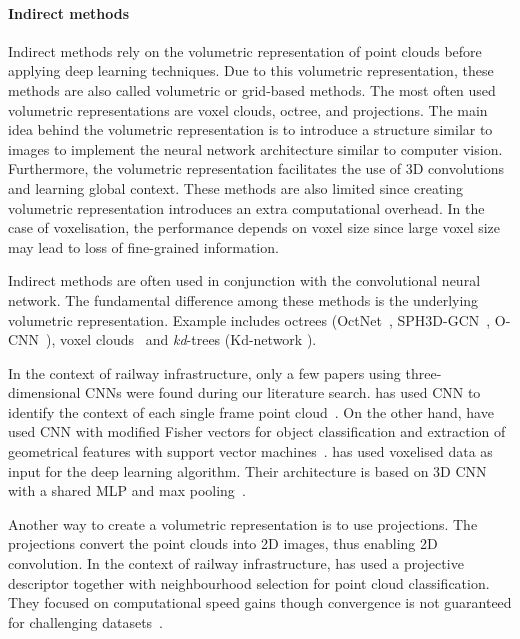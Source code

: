 \paragraph{Indirect methods}
Indirect methods rely on the volumetric representation of point clouds before applying deep learning techniques. Due to this volumetric representation, these methods are also called volumetric or grid-based methods. The most often used volumetric representations are voxel clouds, octree, and projections. The main idea behind the volumetric representation is to introduce a structure similar to images to implement the neural network architecture similar to computer vision. Furthermore, the volumetric representation facilitates the use of 3D convolutions and learning global context. These methods are also limited since creating volumetric representation introduces an extra computational overhead. In the case of voxelisation, the performance depends on voxel size since large voxel size may lead to loss of fine-grained information. 
\par Indirect methods are often used in conjunction with the convolutional neural network. The fundamental difference among these methods is the underlying volumetric representation. Example includes octrees (OctNet~\cite{riegler2017octnet}, SPH3D-GCN~\cite{lei2020spherical}, O-CNN~\cite{wang2017cnn}), voxel clouds~\cite{xu2021voxel} and \textit{kd}-trees (Kd-network \cite{klokov2017escape}).
\par In the context of railway infrastructure, only a few papers using th\-ree-di\-men\-sio\-nal CNNs were found during our literature search. 
\citeauthor{lin2020lidar} has used CNN to identify the context of each single frame point cloud~\cite{lin2020lidar}. On the other hand, \citeauthor{corongiu2020classification} have used CNN with modified Fisher vectors for object classification and extraction of geometrical features with support vector machines~\cite{corongiu2020classification}. 
\citeauthor{yu2022real-time} has used voxelised data as input for the deep learning algorithm. Their architecture is based on 3D CNN with a shared MLP and max pooling~\cite{yu2022real-time}. 

Another way to create a volumetric representation is to use projections. The projections convert the point clouds into 2D images, thus enabling 2D convolution. In the context of railway infrastructure, \citeauthor{manier2022railway} has used a projective descriptor together with neighbourhood selection for point cloud classification. They focused on computational speed gains though convergence is not guaranteed for challenging datasets~\cite{manier2022railway}. 	
   
